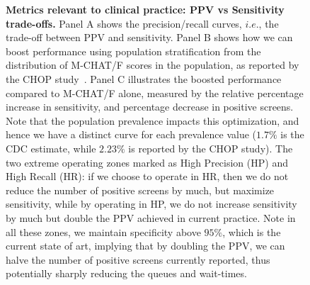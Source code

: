 \documentclass[3p,super,numbers,sort&compress,preprint,10pt]{elsarticle}
\renewcommand{\captionN}[1]{\caption{\color{CadetBlue4!80!black} \sffamily \fontsize{9}{10}\selectfont #1  }}
\begin{document}
\begin{figure}[t]
  \tikzexternalenable
  \vspace{-10pt}

  \centering
  
  \def\AXISCOL{white}
  \def\TEXTCOL{gray}
 

 \vspace{-10pt}

 \captionN{\textbf{Metrics relevant to clinical practice: PPV vs Sensitivity trade-offs.} Panel A shows the precision/recall curves, $i.e.$,  the trade-off between PPV and sensitivity. Panel B shows how we can boost performance using population stratification from the distribution of M-CHAT/F scores in the population, as reported by the CHOP study~\cite{pmid31562252}. Panel C illustrates the boosted performance compared to M-CHAT/F alone,
   measured by the relative percentage increase in sensitivity, and percentage decrease in positive screens. Note that the population prevalence impacts this optimization, and hence  we have  a distinct  curve for each prevalence value ($1.7\%$ is the CDC estimate, while $2.23\%$ is reported by the CHOP study).  The two extreme operating zones marked as High Precision (HP) and High Recall (HR): if we choose to operate in HR, then we do not reduce the number of positive screens by much, but maximize sensitivity, while by operating in HP, we do not increase sensitivity by much but double the PPV achieved in current practice. Note in all these zones, we maintain specificity above $95\%$, which is the current state of art, implying that by doubling the PPV, we can halve the number of positive screens currently reported, thus potentially sharply reducing the queues and wait-times. }\label{figprc}
\end{figure}
\end{document}
